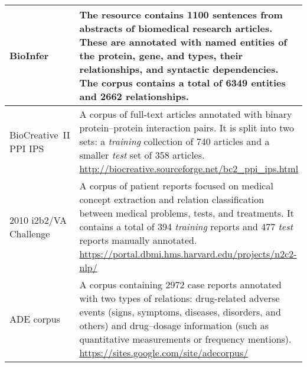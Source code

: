 \begin{longtable}[c]{E{0.30\textwidth}p{0.62\textwidth}}
\midrule

BioInfer\newline
{}
&
The resource contains 1100 sentences from abstracts of biomedical research articles. These are annotated with named entities of the protein, gene, and  types, their relationships, and syntactic dependencies. The corpus contains a total of 6349 entities and 2662 relationships.
\\

\midrule

BioCreative~II PPI IPS\newline
{}\newline
{}
&
A corpus of full-text articles annotated with binary protein--protein interaction pairs. It is split into two sets: a \textit{training} collection of 740 articles and a smaller \textit{test} set of 358 articles.
\newline
{\footnotesize\url{http://biocreative.sourceforge.net/bc2_ppi_ips.html}}
\\

\midrule

2010 i2b2/VA Challenge\newline
{}
&
A corpus of patient reports focused on medical concept extraction and relation classification between medical problems, tests, and treatments. It contains a total of 394 \textit{training} reports and 477 \textit{test} reports manually annotated.\newline
{\footnotesize\url{https://portal.dbmi.hms.harvard.edu/projects/n2c2-nlp/}}
\\

\midrule

ADE corpus\newline
{}\newline
{}
&
A corpus containing 2972  case reports annotated with two types of relations: drug-related adverse events (signs, symptoms, diseases, disorders, and others) and drug--dosage information (such as quantitative measurements or frequency mentions).\newline
{\footnotesize\url{https://sites.google.com/site/adecorpus/}}
\\


\end{longtable}
